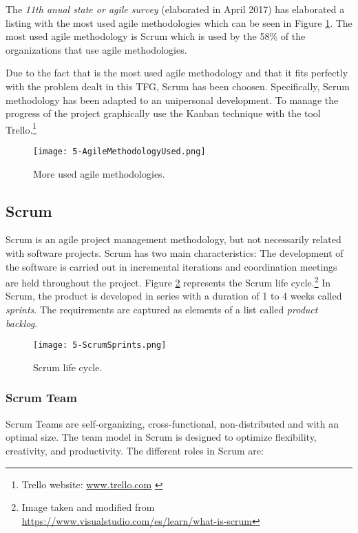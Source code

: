 The \emph{11th anual state or agile survey} \cite{AnualStateAgile} (elaborated in April 2017) has elaborated a listing with the most used agile methodologies which can be seen in Figure \ref{fig:5-AgileMethodologyUsed}. The most used agile methodology is Scrum which is used by the 58\% of the organizations that use agile methodologies. 

Due to the fact that is the most used agile methodology and that it fits perfectly with the problem dealt in this \ac{TFG}, Scrum has been choosen. Specifically, Scrum methodology \cite{ScrumGuide} has been adapted to an unipersonal development. To manage the progress of the project graphically use the Kanban technique with the tool Trello.\footnote{Trello website: \url{www.trello.com} \label{footnote-1}}

\begin{figure}[!h]
	\begin{center}
		\texttt{[image: 5-AgileMethodologyUsed.png]}
		\caption{More used agile methodologies.}
		\label{fig:5-AgileMethodologyUsed}
	\end{center}
\end{figure}


\subsection{Scrum}

Scrum \cite{ScrumGuide} is an agile project management methodology, but not necessarily related with software projects. Scrum has two main characteristics: The development of the software is carried out in incremental iterations and coordination meetings are held throughout the project.
Figure \ref{fig:5-ScrumSprints} represents the Scrum life cycle.\footnote{Image taken and modified from \url{https://www.visualstudio.com/es/learn/what-is-scrum}} In Scrum, the product is developed in series with a duration of 1 to 4 weeks called \emph{sprints}. The requirements are captured as elements of a list called \emph{product backlog}.

\begin{figure}[!h]
	\begin{center}
		\texttt{[image: 5-ScrumSprints.png]}	
		\caption{Scrum life cycle.}
		\label{fig:5-ScrumSprints}
	\end{center}
\end{figure}


\subsubsection{Scrum Team} \label{5-ScrumTeam}
Scrum Teams are self-organizing, cross-functional, non-distributed and with an optimal size. The team model in Scrum is designed to optimize flexibility, creativity, and productivity. The different roles in Scrum are:

